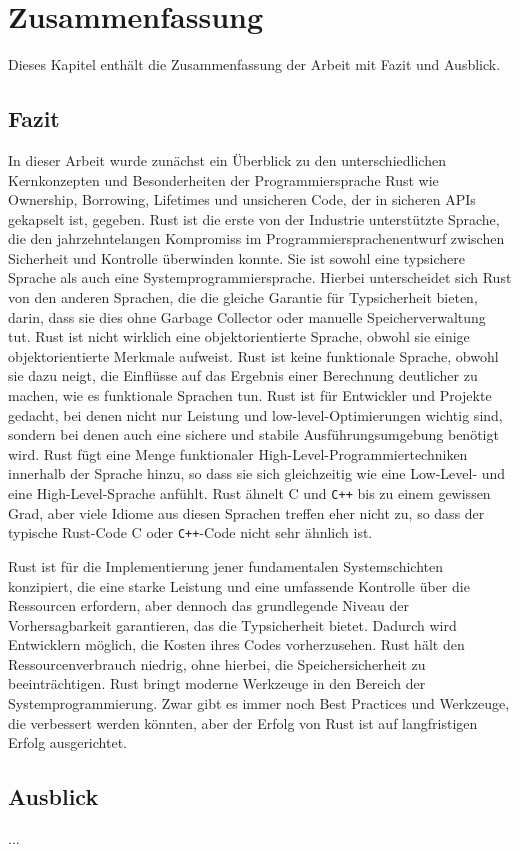 \chapter{Zusammenfassung}

\nocite{*}

Dieses Kapitel enthält die Zusammenfassung der Arbeit mit Fazit und Ausblick.

\section{Fazit}

In dieser Arbeit wurde zunächst ein Überblick zu den unterschiedlichen Kernkonzepten und Besonderheiten der Programmiersprache Rust wie Ownership, Borrowing, Lifetimes und unsicheren Code, der in sicheren APIs gekapselt ist, gegeben. Rust ist die erste von der Industrie unterstützte Sprache, die den jahrzehntelangen Kompromiss im Programmiersprachenentwurf zwischen Sicherheit und Kontrolle überwinden konnte. Sie ist sowohl eine typsichere Sprache als auch eine Systemprogrammiersprache. Hierbei unterscheidet sich Rust von den anderen Sprachen, die die gleiche Garantie für Typsicherheit bieten, darin, dass sie dies ohne Garbage Collector oder manuelle Speicherverwaltung tut. Rust ist nicht wirklich eine objektorientierte Sprache, obwohl sie einige objektorientierte Merkmale aufweist. Rust ist keine funktionale Sprache, obwohl sie dazu neigt, die Einflüsse auf das Ergebnis einer Berechnung deutlicher zu machen, wie es funktionale Sprachen tun. Rust ist für Entwickler und Projekte gedacht, bei denen nicht nur Leistung und low-level-Optimierungen wichtig sind, sondern bei denen auch eine sichere und stabile Ausführungsumgebung benötigt wird. Rust fügt eine Menge funktionaler High-Level-Programmiertechniken innerhalb der Sprache hinzu, so dass sie sich gleichzeitig wie eine Low-Level- und eine High-Level-Sprache anfühlt. Rust ähnelt C und \texttt{C++} bis zu einem gewissen Grad, aber viele Idiome aus diesen Sprachen treffen eher nicht zu, so dass der typische Rust-Code C oder \texttt{C++}-Code nicht sehr ähnlich ist. 

Rust ist für die Implementierung jener fundamentalen Systemschichten konzipiert, die eine starke Leistung und eine umfassende Kontrolle über die Ressourcen erfordern, aber dennoch das grundlegende Niveau der Vorhersagbarkeit garantieren, das die Typsicherheit bietet. Dadurch wird Entwicklern möglich, die Kosten ihres Codes vorherzusehen.
Rust hält den Ressourcenverbrauch niedrig, ohne hierbei, die Speichersicherheit zu beeinträchtigen. Rust bringt moderne Werkzeuge in den Bereich der Systemprogrammierung. Zwar gibt es immer noch Best Practices und Werkzeuge, die verbessert werden könnten, aber der Erfolg von Rust ist auf langfristigen Erfolg ausgerichtet.

\section{Ausblick}

...

